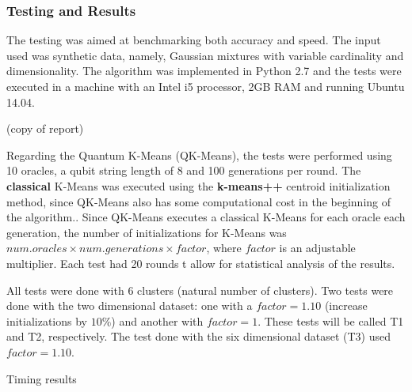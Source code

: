 \documentclass[10pt,a4paper,final]{article}
\begin{document}


\subsubsection{Testing and Results}
The testing was aimed at benchmarking both accuracy and speed. The input used was synthetic data, namely, Gaussian mixtures with variable cardinality and dimensionality. The algorithm was implemented in Python 2.7 and the tests were executed in a machine with an Intel i5 processor, 2GB RAM and running Ubuntu 14.04.

(copy of report)

Regarding the Quantum K-Means (QK-Means), the tests were performed using 10 oracles, a qubit string length of 8 and 100 generations per round. The \textbf{classical} K-Means was executed using the \textbf{k-means++} centroid initialization method, since QK-Means also has some computational cost in the beginning of the algorithm.. Since QK-Means executes a classical K-Means for each oracle each generation, the number of initializations for K-Means was $num.oracles \times num.generations \times factor$, where $factor$ is an adjustable multiplier. Each test had 20 rounds t allow for statistical analysis of the results.

All tests were done with 6 clusters (natural number of clusters). Two tests were done with the two dimensional dataset: one with a $factor=1.10$ (increase initializations by $10\%$) and another with $factor=1$. These tests will be called T1 and T2, respectively. The test done with the six dimensional dataset (T3) used $factor=1.10$.

Timing results

\end{document}
